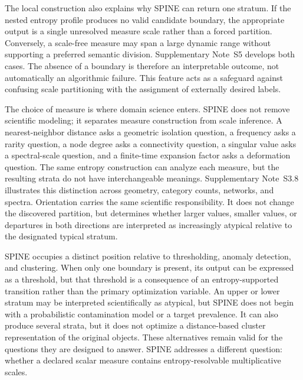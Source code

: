 \documentclass[aip,cha,reprint,superscriptaddress,floatfix]{revtex4-2}
\theoremstyle{definition}
\theoremstyle{remark}
\begin{document}
The local construction also explains why SPINE can return one stratum. If the nested entropy profile produces no valid candidate boundary, the appropriate output is a single unresolved measure scale rather than a forced partition. Conversely, a scale-free measure may span a large dynamic range without supporting a preferred semantic division. Supplementary Note~S5 develops both cases. The absence of a boundary is therefore an interpretable outcome, not automatically an algorithmic failure. This feature acts as a safeguard against confusing scale partitioning with the assignment of externally desired labels.

The choice of measure is where domain science enters. SPINE does not remove scientific modeling; it separates measure construction from scale inference. A nearest-neighbor distance asks a geometric isolation question, a frequency asks a rarity question, a node degree asks a connectivity question, a singular value asks a spectral-scale question, and a finite-time expansion factor asks a deformation question. The same entropy construction can analyze each measure, but the resulting strata do not have interchangeable meanings. Supplementary Note~S3.8 illustrates this distinction across geometry, category counts, networks, and spectra. Orientation carries the same scientific responsibility. It does not change the discovered partition, but determines whether larger values, smaller values, or departures in both directions are interpreted as increasingly atypical relative to the designated typical stratum.

SPINE occupies a distinct position relative to thresholding, anomaly detection, and clustering. When only one boundary is present, its output can be expressed as a threshold, but that threshold is a consequence of an entropy-supported transition rather than the primary optimization variable. An upper or lower stratum may be interpreted scientifically as atypical, but SPINE does not begin with a probabilistic contamination model or a target prevalence. It can also produce several strata, but it does not optimize a distance-based cluster representation of the original objects. These alternatives remain valid for the questions they are designed to answer. SPINE addresses a different question: whether a declared scalar measure contains entropy-resolvable multiplicative scales.
\end{document}
